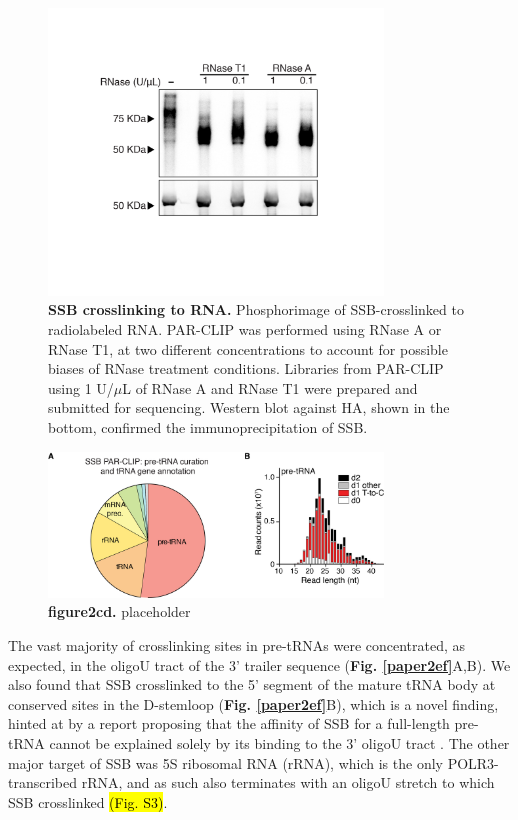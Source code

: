 \documentclass[12pt]{rockefeller}
\begin{document}
\begin{figure}[!ht]%
\centering
\includegraphics[width=3.5in]{paper2b.png}%
\caption[SSB crosslinking to RNA]
{\textbf{SSB crosslinking to RNA.}
Phosphorimage of SSB-crosslinked to radiolabeled RNA. PAR-CLIP was performed using RNase A or RNase T1, at two different concentrations to 
account for possible biases of RNase treatment conditions. Libraries from PAR-CLIP using 1 U/$\mu$L of RNase A and RNase T1 were prepared and submitted for sequencing. Western blot against HA, shown in the bottom, confirmed the immunoprecipitation of SSB.}
\centering
\label{paper2b}%
\end{figure}


\begin{figure}[!ht]%
\centering
\includegraphics[width=3.5in]{paper2cd.png}%
\caption[figure2cd]
{\textbf{figure2cd.}
placeholder}
\centering
\label{paper2cd}%
\end{figure}

The vast majority of crosslinking sites in pre-tRNAs were concentrated, as expected, in the oligoU tract of the 3’ trailer sequence (\textbf{Fig. \ref{paper2ef}}A,B). We also found that SSB crosslinked to the 5’ segment of the mature tRNA body at conserved sites in the D-stemloop (\textbf{Fig. \ref{paper2ef}}B), which is a novel finding, hinted at by a report proposing that the affinity of SSB for a full-length pre-tRNA cannot be explained solely by its binding to the 3’ oligoU tract \cite{Bayfield:2009cx}. The other major target of SSB was 5S ribosomal RNA (rRNA), which is the only POLR3-transcribed rRNA, and as such also terminates with an oligoU stretch to which SSB crosslinked \hl{(Fig. S3)}. 
\end{document}
